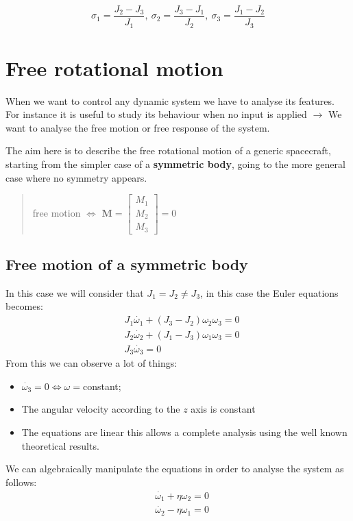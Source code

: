 \begin{equation*}
    \sigma_1 = \frac{J_2-J_3}{J_1}, \
    \sigma_2 = \frac{J_3-J_1}{J_2}, \ 
    \sigma_3 = \frac{J_1-J_2}{J_3}
\end{equation*}

\section{Free rotational motion}
When we want to control any dynamic system we have to analyse its features. For instance it is useful to study its behaviour when no input is applied $\to$ We want to analyse the free motion or free response of the system.

The aim here is to describe the free rotational motion of a generic spacecraft, starting from the simpler case of a \textbf{symmetric body}, going to the more general case where no symmetry appears. 

\begin{quotation}
    \centering
    \large
    free motion $\iff$ $\mathbf{M}=\begin{bmatrix}
        M_1\\M_2\\M_3
    \end{bmatrix}=0$
\end{quotation}
    
\subsection{Free motion of a symmetric body}
In this case we will consider that $J_1=J_2 \ne J_3$, in this case the Euler equations becomes:
\begin{equation*}
    \begin{aligned}
        &J_1\dot{\omega_1}+(J_3-J_2)\omega_2\omega_3=0\\
        &J_2\dot{\omega_2}+(J_1-J_3){\omega_1\omega_3}=0\\
        &J_3\dot{\omega_3}=0
    \end{aligned}
\end{equation*}
From this we can observe a lot of things:
\begin{itemize}
    \item $\dot{\omega_3}=0 \iff \omega=$constant;
    \item The angular velocity according to the $z$ axis is constant
    \item The equations are linear this allows a complete analysis using the well known theoretical results.
\end{itemize}
We can algebraically manipulate the equations in order to analyse the system as follows:
\begin{align}
    &\dot{\omega_1} + \eta\omega_2=0 \label{eq: first_eq}\\
    &\dot{\omega_2}-\eta\omega_1=0 \label{eq: second_eq}
\end{align}

